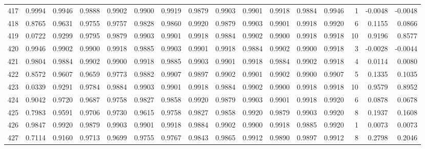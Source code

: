 \begin{tabular}{lrrrrrrrrrrrrrrr}
417 &      0.9994 &  0.9946 &  0.9888 &  0.9902 &  0.9900 &  0.9919 &  0.9879 &  0.9903 &  0.9901 &  0.9918 &   0.9884 &     0.9946 &      1 &                   -0.0048 &                    -0.0048 \\
418 &      0.8765 &  0.9631 &  0.9755 &  0.9757 &  0.9828 &  0.9860 &  0.9920 &  0.9879 &  0.9903 &  0.9901 &   0.9918 &     0.9920 &      6 &                    0.1155 &                     0.0866 \\
419 &      0.0722 &  0.9299 &  0.9795 &  0.9879 &  0.9903 &  0.9901 &  0.9918 &  0.9884 &  0.9902 &  0.9900 &   0.9918 &     0.9918 &     10 &                    0.9196 &                     0.8577 \\
420 &      0.9946 &  0.9902 &  0.9900 &  0.9918 &  0.9885 &  0.9903 &  0.9901 &  0.9918 &  0.9884 &  0.9902 &   0.9900 &     0.9918 &      3 &                   -0.0028 &                    -0.0044 \\
421 &      0.9804 &  0.9884 &  0.9902 &  0.9900 &  0.9918 &  0.9885 &  0.9903 &  0.9901 &  0.9918 &  0.9884 &   0.9902 &     0.9918 &      4 &                    0.0114 &                     0.0080 \\
422 &      0.8572 &  0.9607 &  0.9659 &  0.9773 &  0.9882 &  0.9907 &  0.9897 &  0.9902 &  0.9901 &  0.9902 &   0.9900 &     0.9907 &      5 &                    0.1335 &                     0.1035 \\
423 &      0.0339 &  0.9291 &  0.9784 &  0.9884 &  0.9903 &  0.9901 &  0.9918 &  0.9884 &  0.9902 &  0.9900 &   0.9918 &     0.9918 &     10 &                    0.9579 &                     0.8952 \\
424 &      0.9042 &  0.9720 &  0.9687 &  0.9758 &  0.9827 &  0.9858 &  0.9920 &  0.9879 &  0.9903 &  0.9901 &   0.9918 &     0.9920 &      6 &                    0.0878 &                     0.0678 \\
425 &      0.7983 &  0.9591 &  0.9706 &  0.9730 &  0.9615 &  0.9758 &  0.9827 &  0.9858 &  0.9920 &  0.9879 &   0.9903 &     0.9920 &      8 &                    0.1937 &                     0.1608 \\
426 &      0.9847 &  0.9920 &  0.9879 &  0.9903 &  0.9901 &  0.9918 &  0.9884 &  0.9902 &  0.9900 &  0.9918 &   0.9885 &     0.9920 &      1 &                    0.0073 &                     0.0073 \\
427 &      0.7114 &  0.9160 &  0.9713 &  0.9699 &  0.9755 &  0.9767 &  0.9843 &  0.9865 &  0.9912 &  0.9890 &   0.9897 &     0.9912 &      8 &                    0.2798 &                     0.2046 \\

\end{tabular}
